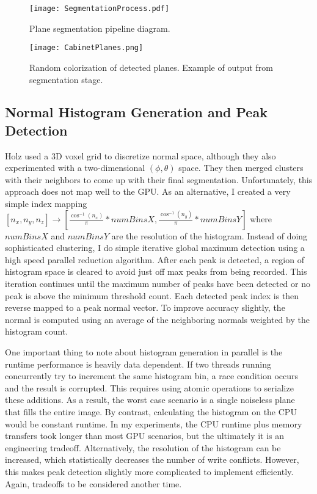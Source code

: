 \begin{figure}[hp]
    \centering
    \texttt{[image: SegmentationProcess.pdf]}
    \caption{Plane segmentation pipeline diagram.}
    \label{fig:segmentationdiagram}
\end{figure}

\begin{figure}[ht]
    \centering
    \texttt{[image: CabinetPlanes.png]}
    \caption{Random colorization of detected planes. Example of output from segmentation stage.}
    \label{fig:segmentationoutput}
\end{figure}

\subsection{Normal Histogram Generation and Peak Detection}
Holz\cite{holz2012real} used a 3D voxel grid to discretize normal space, although they also experimented with a two-dimensional $(\phi,\theta)$ space. They then merged clusters with their neighbors to come up with their final segmentation. Unfortunately, this approach does not map well to the GPU. As an alternative, I created a very simple index mapping $[n_x,n_y,n_z] \to [\frac{\cos^{-1}(n_x)}{\pi}*numBinsX,\frac{\cos^{-1}(n_y)}{\pi}*numBinsY]$ where $numBinsX$ and $numBinsY$ are the resolution of the histogram. Instead of doing sophisticated clustering, I do simple iterative global maximum detection using a high speed parallel reduction algorithm. After each peak is detected, a region of histogram space is cleared to avoid just off max peaks from being recorded. This iteration continues until the maximum number of peaks have been detected or no peak is above the minimum threshold count. Each detected peak index is then reverse mapped to a peak normal vector. To improve accuracy slightly, the normal is computed using an average of the neighboring normals weighted by the histogram count.\par
One important thing to note about histogram generation in parallel is the runtime performance is heavily data dependent. If two threads running concurrently try to increment the same histogram bin, a race condition occurs and the result is corrupted. This requires using atomic operations to serialize these additions. As a result, the worst case scenario is a single noiseless plane that fills the entire image. By contrast, calculating the histogram on the CPU would be constant runtime. In my experiments, the CPU runtime plus memory transfers took longer than most GPU scenarios, but the ultimately it is an engineering tradeoff. Alternatively, the resolution of the histogram can be increased, which statistically decreases the number of write conflicts. However, this makes peak detection slightly more complicated to implement efficiently. Again, tradeoffs to be considered another time.
